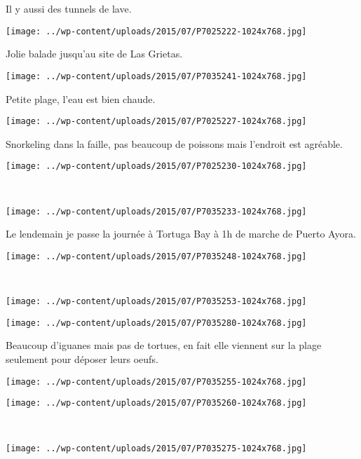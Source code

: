 Il y aussi des tunnels de lave. 
\begin{center} \texttt{[image: ../wp-content/uploads/2015/07/P7025222-1024x768.jpg]} \end{center}

Jolie balade jusqu'au site de Las Grietas. 
\begin{center} \texttt{[image: ../wp-content/uploads/2015/07/P7035241-1024x768.jpg]} \end{center}
\vspace{-\topsep}
\pagebreak

Petite plage, l'eau est bien chaude. 
\begin{center} \texttt{[image: ../wp-content/uploads/2015/07/P7025227-1024x768.jpg]} \end{center}

Snorkeling dans la faille, pas beaucoup de poissons mais l'endroit est agréable. 
\begin{center} \texttt{[image: ../wp-content/uploads/2015/07/P7025230-1024x768.jpg]} \end{center}
\vspace{-\topsep}
\pagebreak
~
\begin{center} \texttt{[image: ../wp-content/uploads/2015/07/P7035233-1024x768.jpg]} \end{center}

Le lendemain je passe la journée à Tortuga Bay à 1h de marche de Puerto Ayora. 
\begin{center} \texttt{[image: ../wp-content/uploads/2015/07/P7035248-1024x768.jpg]} \end{center}
\vspace{-\topsep}
\pagebreak
~\\
\begin{center} \texttt{[image: ../wp-content/uploads/2015/07/P7035253-1024x768.jpg]} \end{center}
\begin{center} \texttt{[image: ../wp-content/uploads/2015/07/P7035280-1024x768.jpg]} \end{center}
\vspace{-\topsep}
\vspace{-2.75mm}
\pagebreak

Beaucoup d'iguanes mais pas de tortues, en fait elle viennent sur la plage seulement pour déposer leurs oeufs. 
\begin{center} \texttt{[image: ../wp-content/uploads/2015/07/P7035255-1024x768.jpg]} \end{center}
\begin{center} \texttt{[image: ../wp-content/uploads/2015/07/P7035260-1024x768.jpg]} \end{center}
\vspace{-\topsep}
\vspace{-2.75mm}
\pagebreak
~\\
\begin{center} \texttt{[image: ../wp-content/uploads/2015/07/P7035275-1024x768.jpg]} \end{center}

